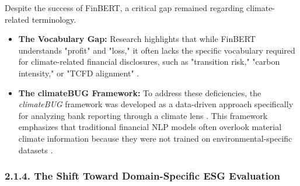 \documentclass{article}
\begin{document}
Despite the success of FinBERT, a critical gap remained regarding climate-related terminology.
\begin{itemize}
\item 

\textbf{The Vocabulary Gap:} Research highlights that while FinBERT understands "profit" and "loss," it often lacks the specific vocabulary required for climate-related financial disclosures, such as "transition risk," "carbon intensity," or "TCFD alignment"  \parencite{yinan_yu_e282fd98}.\item 

\textbf{The climateBUG Framework:} To address these deficiencies, the \textit{climateBUG} framework was developed as a data-driven approach specifically for analyzing bank reporting through a climate lens  \parencite{yinan_yu_e282fd98}. This framework emphasizes that traditional financial NLP models often overlook material climate information because they were not trained on environmental-specific datasets  \parencite{yinan_yu_e282fd98}.
\end{itemize}
\subsubsection*{2.1.4. The Shift Toward Domain-Specific ESG Evaluation}
\end{document}
